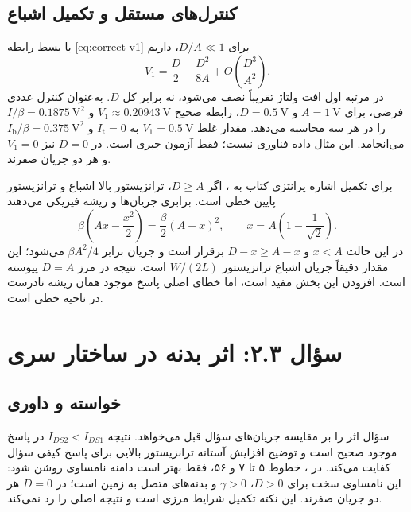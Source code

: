\documentclass[12pt,a4paper]{article}
\newcommand{\exnum}[1]{\mbox{\beginL#1\endL}}
\newcommand{\reviewfile}[1]{\lr{\small\texttt{#1}}}
\begin{document}
\subsection*{کنترل‌های مستقل و تکمیل اشباع}
با بسط رابطه \eqref{eq:correct-v1} برای \(D/A\ll1\)، داریم
\begin{equation}
 V_1=\frac{D}{2}-\frac{D^2}{8A}
       +O\!\left(\frac{D^3}{A^2}\right).
 \label{eq:v1-small}
\end{equation}
در مرتبه اول افت ولتاژ تقریباً نصف می‌شود، نه برابر کل \(D\). به‌عنوان کنترل عددی فرضی، برای \(A=\qty{1}{\volt}\) و \(D=\qty{0.5}{\volt}\)، رابطه صحیح \(V_1\approx\qty{0.20943}{\volt}\) و \(I/\beta=\qty{0.1875}{\volt\squared}\) را در هر سه محاسبه می‌دهد. مقدار غلط \(V_1=\qty{0.5}{\volt}\) به \(I_{\mathrm{t}}=0\) و \(I_{\mathrm{b}}/\beta=\qty{0.375}{\volt\squared}\) می‌انجامد. این مثال داده فناوری نیست؛ فقط آزمون جبری است. در \(D=0\) نیز \(V_1=0\) و هر دو جریان صفرند.

برای تکمیل اشاره پرانتزی کتاب به ، اگر \(D\ge A\)، ترانزیستور بالا اشباع و ترانزیستور پایین خطی است. برابری جریان‌ها و ریشه فیزیکی می‌دهند
\begin{equation}
 \beta\left(Ax-\frac{x^2}{2}\right)=\frac{\beta}{2}(A-x)^2,
 \qquad x=A\left(1-\frac{1}{\sqrt{2}}\right).
 \label{eq:stack-sat}
\end{equation}
در این حالت \(x<A\) و \(D-x\ge A-x\) برقرار است و جریان برابر \(\beta A^2/4\) می‌شود؛ این مقدار دقیقاً جریان اشباع ترانزیستور \(W/(2L)\) است. نتیجه در مرز \(D=A\) پیوسته است. افزودن این بخش مفید است، اما خطای اصلی پاسخ موجود همان ریشه نادرست در ناحیه خطی است.

\section*{سؤال \exnum{۲.۳}: اثر بدنه در ساختار سری}
\subsection*{خواسته و داوری}
سؤال اثر  را بر مقایسه جریان‌های سؤال قبل می‌خواهد. نتیجه \(I_{DS2}<I_{DS1}\) در پاسخ موجود صحیح است و توضیح افزایش آستانه ترانزیستور بالایی برای پاسخ کیفی سؤال کفایت می‌کند. در \reviewfile{2/solutions/2-3.tex}، خطوط ۵ تا ۷ و ۵۶، فقط بهتر است دامنه نامساوی روشن شود: این نامساوی سخت برای \(D>0\)، \(\gamma>0\) و بدنه‌های متصل به زمین است؛ در \(D=0\) هر دو جریان صفرند. این نکته تکمیل شرایط مرزی است و نتیجه اصلی را رد نمی‌کند.
\end{document}
